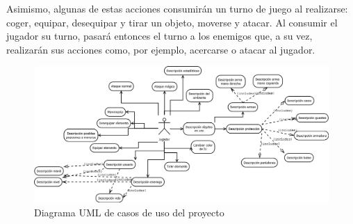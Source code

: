 \noindent Asimismo, algunas de estas acciones consumirán un turno de juego al realizarse: coger, equipar, desequipar y tirar un objeto, moverse y atacar. Al consumir el jugador su turno, pasará entonces el turno a los enemigos que, a su vez, realizarán sus acciones como, por ejemplo, acercarse o atacar al jugador.

\begin{figure}[h!]
    \centering
    \includegraphics[width=0.9\textheight,angle=90]{img/casosdeuso.png}
    \caption{Diagrama UML de casos de uso del proyecto}
    \label{fig:casosdeuso}
\end{figure}